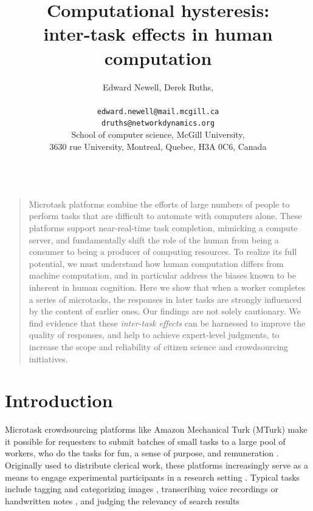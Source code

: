 \documentclass[12pt]{article}
\title{Computational hysteresis:\\ inter-task effects in human computation}
\author
{Edward Newell, Derek Ruths,\\
\\
\normalsize{\texttt{edward.newell@mail.mcgill.ca}}\\
\normalsize{\texttt{druths@networkdynamics.org}}\\
\normalsize{School of computer science, McGill University,}\\
\normalsize{3630 rue University, Montreal, Quebec, H3A 0C6, Canada}\\
\\
}
\date{}
\newenvironment{sciabstract}{%
\begin{quote} \bf}
{\end{quote}}
\begin{document}
 


\baselineskip24pt


\maketitle 




\begin{sciabstract}

Microtask platforms combine the efforts of large numbers 
of people to perform tasks that are difficult to automate with computers 
alone.  These platforms support near-real-time task completion, mimicking a
compute server, and fundamentally shift the role of the human from being a
consumer to being a producer of computing resources.  To realize its full
potential, we must understand how human computation differs from machine 
computation, and in particular address the biases known to be inherent in 
human cognition.  Here we show that when a worker completes a series of 
microtasks, the responses in later tasks are strongly influenced by the 
content of earlier ones.  Our findings are not solely cautionary. We find
evidence that these \textit{inter-task effects} can be
harnessed to improve the quality of responses, and help to achieve 
expert-level judgments, to increase the scope and reliability of citizen 
science and crowdsourcing initiatives.
\end{sciabstract}

\section*{Introduction}
Microtask crowdsourcing platforms like Amazon Mechanical Turk (MTurk) make it 
possible for requesters to submit batches of small tasks to a large pool of 
workers, who do the tasks for fun, a sense of purpose, and remuneration 
\cite{kazai2013analysis,Antin20122925}.  
Originally used to distribute clerical work, these platforms 
increasingly serve as a means to engage experimental 
participants in a research 
setting \cite{paolacci2010running,Berinsky2012351,snow2008cheap,alonso2009can}.
Typical tasks include tagging and categorizing images 
\cite{6116320,Zhai2012357}, transcribing voice recordings 
\cite{chandler2013breaking,paolacci2010running}
or handwritten notes \cite{Berinsky2012351,Finnerty2013}, and judging the 
relevancy of search results \cite{le2010ensuring,grady2010crowdsourcing,alonso2009can,kazai2013analysis}
\end{document}
